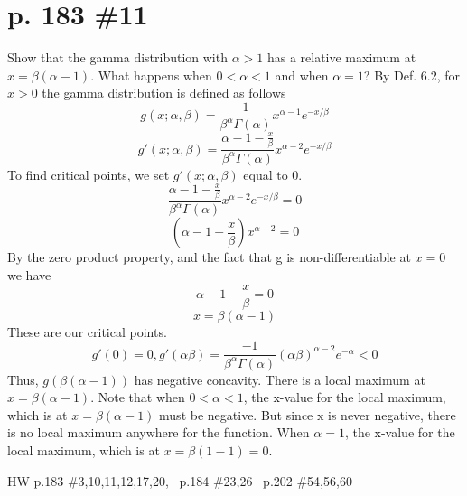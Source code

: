 \documentclass[12pt]{article}
\begin{document}
	\section[20pt]{p. 183 \#11}
	Show that the gamma distribution with \(\alpha>1\) has a relative maximum at \(x=\beta(\alpha-1)\). What happens when \(0<\alpha<1\) and when \(\alpha=1\)? \newline
	\newline
	By Def. 6.2, for \(x>0\) the gamma distribution is defined as follows
	\[g(x;\alpha,\beta)=\frac{1}{\beta^\alpha\Gamma(\alpha)}x^{\alpha-1}e^{-x/\beta}\]
	\[g'(x;\alpha,\beta)=\frac{\alpha-1-\frac{x}{\beta}}{\beta^\alpha\Gamma(\alpha)}x^{\alpha-2}e^{-x/\beta}\]
	To find critical points, we set \(g'(x;\alpha,\beta)\) equal to 0.
	\[\frac{\alpha-1-\frac{x}{\beta}}{\beta^\alpha\Gamma(\alpha)}x^{\alpha-2}e^{-x/\beta}=0\]
	\[(\alpha-1-\frac{x}{\beta})x^{\alpha-2}=0\]
	By the zero product property, and the fact that g is non-differentiable at \(x=0\) we have
	\[\alpha-1-\frac{x}{\beta}=0\]
	\[x=\beta(\alpha-1)\]
	These are our critical points.
	\[g'(0)=0, g'(\alpha\beta)=\frac{-1}{\beta^\alpha\Gamma(\alpha)}(\alpha\beta)^{\alpha-2}e^{-\alpha}<0\]
	Thus, \(g(\beta(\alpha-1))\) has negative concavity.
	\newline
	\newline
	There is a local maximum at \(x=\beta(\alpha-1)\).
	\newline
	\newline
	Note that when \(0<\alpha<1\), the x-value for the local maximum, which is at \(x=\beta(\alpha-1)\) must be negative. But since x is never negative, there is no local maximum anywhere for the function. \newline \newline
	When \(\alpha=1\), the x-value for the local maximum, which is at \(x=\beta(1-1)=0\).
	
	\newpage
	\maketitle HW p.183 \#3,10,11,12,17,20, \ p.184 \#23,26 \ p.202 \#54,56,60
\end{document}
